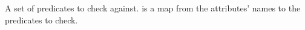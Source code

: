 A set of predicates to check against.   is a map from the
attributes' names to the predicates to check.
